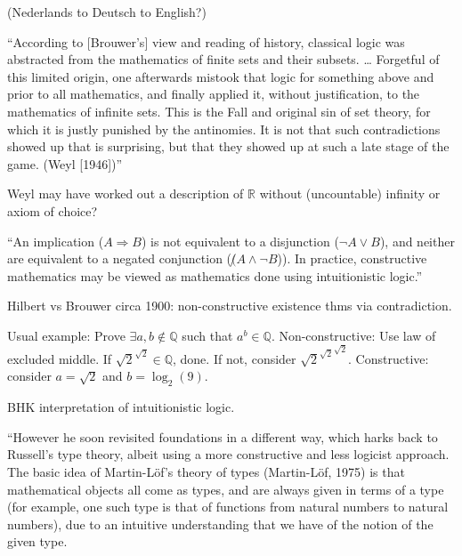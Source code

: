 (Nederlands to Deutsch to English?)

``According to [Brouwer’s] view and reading of history, 
classical logic was abstracted 
from the mathematics of finite sets and their subsets. \ldots 
Forgetful of this limited origin, 
one afterwards mistook that logic 
for something above and prior to all mathematics, 
and finally applied it, without justification, 
to the mathematics of infinite sets. 
This is the Fall and original sin of set theory, 
for which it is justly punished by the antinomies. 
It is not that such contradictions showed up that is surprising,
 but that they showed up at such a late stage of the game. 
 (Weyl [1946])''
 
Weyl may have worked out a description of
$\mathbb{R}$ without (uncountable) infinity or
axiom of choice?

\label{sec:Constructivism_IEP}
\cite{iep:Constructive_mathematics}

``An implication ($A \Rightarrow B$) is not equivalent 
to a disjunction ($\lnot A \vee B$), 
and neither are equivalent to a negated conjunction 
($\not (A \wedge \lnot B$)). 
In practice, constructive mathematics may be viewed 
as mathematics done using intuitionistic 
logic.''\cite{iep:Constructive_mathematics}

Hilbert vs Brouwer circa 1900: 
non-constructive existence thms via contradiction.

Usual example: Prove $\exists a,b \notin \mathbb{Q}$
such that $a^b \in \mathbb{Q}$. \hfill\break
Non-constructive: Use law of excluded middle.
If $\sqrt{2}^{\sqrt{2}} \in \mathbb{Q}$, done.
If not, consider ${\sqrt{2}^{\sqrt{2}}}^{\sqrt{2}}$.
\hfill\break
Constructive: consider $a=\sqrt{2}$ and $b=\log_2(9)$.

BHK interpretation of intuitionistic 
logic\cite{wiki:Brouwer_Heyting_Kolmogorov_interpretation}.

\label{sec:Martin_Lof_IEP}

``However he soon revisited foundations in a different way, 
which harks back to Russell's type theory, 
albeit using a more constructive and less logicist approach. 
The basic idea of Martin-Löf's theory of types (Martin-Löf, 1975) 
is
that mathematical objects all come as types, 
and are always given in terms of a
type (for example, one such type is that of functions 
from natural numbers to
natural numbers), due to an intuitive understanding 
that we have of the notion
of the given type.

